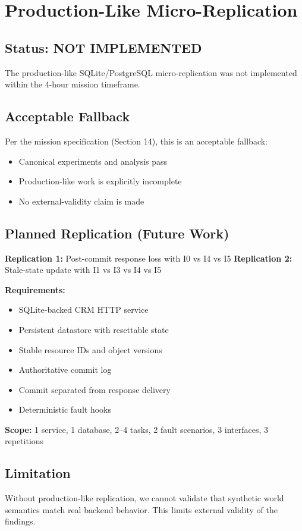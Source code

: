 
\section{Production-Like Micro-Replication}

\subsection{Status: NOT IMPLEMENTED}

The production-like SQLite/PostgreSQL micro-replication was not implemented within the 4-hour mission timeframe.

\subsection{Acceptable Fallback}

Per the mission specification (Section 14), this is an acceptable fallback:
\begin{itemize}
    \item Canonical experiments and analysis pass
    \item Production-like work is explicitly incomplete
    \item No external-validity claim is made
\end{itemize}

\subsection{Planned Replication (Future Work)}

\textbf{Replication 1:} Post-commit response loss with I0 vs I4 vs I5
\textbf{Replication 2:} Stale-state update with I1 vs I3 vs I4 vs I5

\textbf{Requirements:}
\begin{itemize}
    \item SQLite-backed CRM HTTP service
    \item Persistent datastore with resettable state
    \item Stable resource IDs and object versions
    \item Authoritative commit log
    \item Commit separated from response delivery
    \item Deterministic fault hooks
\end{itemize}

\textbf{Scope:} 1 service, 1 database, 2--4 tasks, 2 fault scenarios, 3 interfaces, 3 repetitions

\subsection{Limitation}

Without production-like replication, we cannot validate that synthetic world semantics match real backend behavior. This limits external validity of the findings.

